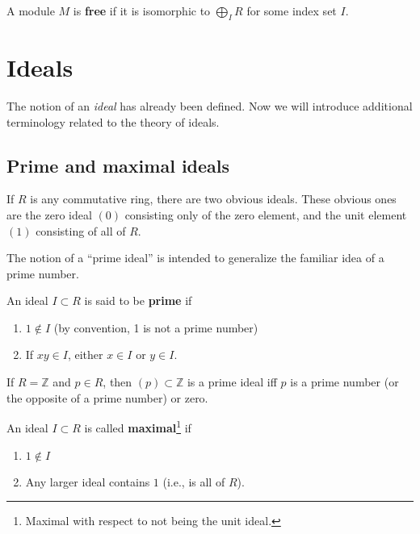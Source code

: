 \begin{definition} 
A module $M$ is \textbf{free} if it is isomorphic to $\bigoplus_I R$ for some
index set $I$. 
\end{definition} 




\section{Ideals}

The notion of an \emph{ideal} has already been defined. Now we will introduce additional terminology related to the theory of ideals.

\subsection{Prime and maximal ideals}

If $R$ is any commutative ring, there are two obvious ideals. These obvious
ones are the zero ideal $(0)$
consisting only of the zero element, and the unit element $(1)$ consisting of all of
$R$.


The notion of a ``prime ideal'' is intended to generalize the familiar idea of a prime
number.

\begin{definition} 
An ideal $I \subset R$ is said to be \textbf{prime} if
\begin{enumerate}[\textbf{P} 1]
\item  $1 \notin I$ (by convention, 1 is not a prime number)
\item If $xy \in I$, either $x \in I$ or $y \in I$.
\end{enumerate}
\end{definition} 

\begin{example}
\label{integerprimes}
If $R = \mathbb{Z}$ and $p \in R$, then $(p) \subset \mathbb{Z}$ is a prime ideal iff $p$ is a
prime number (or the opposite of a prime number) or zero.
\end{example} 

\begin{definition} 
An ideal $I \subset R$ is called \textbf{maximal}\footnote{Maximal with
respect to not being the unit ideal.} if 
\begin{enumerate}[\textbf{M} 1]
\item  $1 \notin I$
\item Any larger ideal contains $1$ (i.e., is all of $R$).
\end{enumerate}
\end{definition} 

